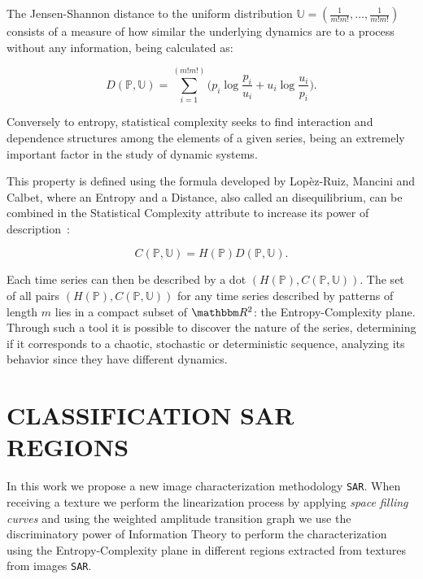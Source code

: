 \documentclass{isprs}
\begin{document}
	The Jensen-Shannon distance to the uniform distribution $\mathbb{U} = (\frac{1}{m!m!}, \dots, \frac{1}{m!m!})$ consists of a measure of how similar the underlying dynamics are to a process without any information, being calculated as:
	
	\begin{equation}
	D(\mathbb{P}, \mathbb{U}) = \sum_{i=1}^{(m!m!)} \Big(p_i \log\frac{p_i}{u_i} +
	u_i \log\frac{u_i}{p_i}
	\Big).
	\end{equation}
	
	Conversely to entropy, statistical complexity seeks to find interaction and dependence structures among the elements of a given series, being an extremely important factor in the study of dynamic systems.
	
	This property is defined using the formula developed by Lopèz-Ruiz, Mancini and Calbet, where an Entropy and a Distance, also called an disequilibrium, can be combined in the Statistical Complexity attribute to increase its power of description~\citep{Feldman2008information,Feldman1998Statistical,Lopez1995statistical}:
	
	\begin{equation}
	C(\mathbb{P}, \mathbb{U}) = H(\mathbb{P}) D(\mathbb{P}, \mathbb{U}).
	\end{equation}
	
	Each time series can then be described by a dot $(H(\mathbb{P}), C(\mathbb{P}, \mathbb{U}))$.
	The set of all pairs $(H(\mathbb{P}), C(\mathbb{P}, \mathbb{U}))$ for any time series described by patterns of length $m$ lies in a compact subset of $\mathbbm R^2$: the Entropy-Complexity plane. 
	Through such a tool it is possible to discover the nature of the series, determining if it corresponds to a chaotic, stochastic or deterministic sequence, analyzing its behavior since they have different dynamics.
	
	\section{CLASSIFICATION SAR REGIONS}\label{SAR}
	
	In this work we propose a new image characterization methodology \texttt{SAR}.
	When receiving a texture we perform the linearization process by applying \textit{space filling curves} and using the weighted amplitude transition graph we use the discriminatory power of Information Theory to perform the characterization using the Entropy-Complexity plane in different regions extracted from textures from images \texttt{SAR}.
	
\end{document}
